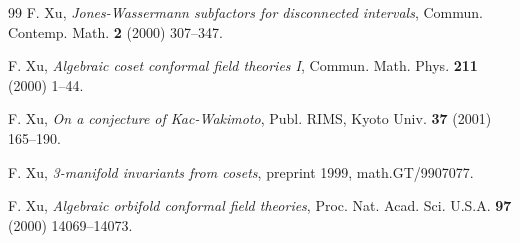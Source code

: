 \documentclass[12pt]{article}
\begin{document}
{\begin{thebibliography}{99}
F. Xu,
{\it Jones-Wassermann subfactors for disconnected intervals},
Commun. Contemp. Math. {\bf 2} (2000) 307--347.

F. Xu,
{\it Algebraic coset conformal field theories I},
Commun. Math. Phys. {\bf 211} (2000) 1--44.

F. Xu,
{\it On a conjecture of Kac-Wakimoto},
Publ. RIMS, Kyoto Univ. {\bf 37} (2001) 165--190.

F. Xu,
{\it 3-manifold invariants from cosets}, preprint 1999,
math.GT/9907077.

F. Xu,
{\it Algebraic orbifold conformal field theories},
Proc. Nat. Acad. Sci. U.S.A.
{\bf 97} (2000) 14069--14073.

\end{thebibliography}}
\end{document}
